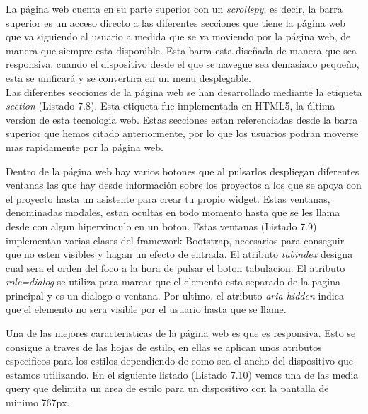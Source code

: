 La página web cuenta en su parte superior con un \textit{scrollspy}, es decir, la barra superior es un acceso directo a las diferentes secciones que tiene la página web que va siguiendo al usuario a medida que se va moviendo por la página web, de manera que siempre esta disponible. Esta barra esta diseñada de manera que sea responsiva, cuando el dispositivo desde el que se navegue sea demasiado pequeño, esta se unificará y se convertira en un menu desplegable.\\

Las diferentes secciones de la página web se han desarrollado mediante la etiqueta \textit{section} (Listado 7.8). Esta etiqueta fue implementada en HTML5, la última version de esta tecnologia web. Estas secciones estan referenciadas desde la barra superior que hemos citado anteriormente, por lo que los usuarios podran moverse mas rapidamente por la página web.\\



Dentro de la página web hay varios botones que al pulsarlos despliegan diferentes ventanas las que hay desde información sobre los proyectos a los que se apoya con el proyecto hasta un asistente para crear tu propio widget. Estas ventanas, denominadas modales, estan ocultas en todo momento hasta que se les llama desde con algun hipervinculo en un boton. Estas ventanas (Listado 7.9) implementan varias clases del framework Bootstrap, necesarios para conseguir que no esten visibles y hagan un efecto de entrada. El atributo \textit{tabindex} designa cual sera el orden del foco a la hora de pulsar el boton tabulacion. El atributo \textit{role=dialog} se utiliza para marcar que el elemento esta separado de la pagina principal y es un dialogo o ventana. Por ultimo, el atributo \textit{aria-hidden} indica que el elemento no sera visible por el usuario hasta que se llame.\\


Una de las mejores caracteristicas de la página web es que es responsiva. Esto se consigue a traves de las hojas de estilo, en ellas se aplican unos atributos especificos para los estilos dependiendo de como sea el ancho del dispositivo que estamos utilizando. En el siguiente listado (Listado 7.10) vemos una de las media query\cite{mediaqueries} que delimita un area de estilo para un dispositivo con la pantalla de minimo 767px.\\

